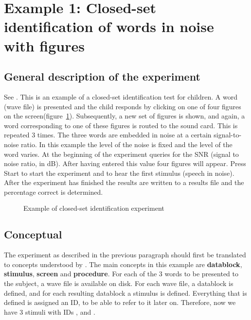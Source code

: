 \newpage
\section{Example 1: Closed-set identification of words in noise with
figures}

\subsection{General description of the experiment} See
. This is an example
of a closed-set identification test for children. A word (wave
file) is presented and the child responds by clicking on one of
four figures on the screen(figure~\ref{fig:closedset}).
Subsequently, a new set of figures is shown, and again, a word
corresponding to one of these figures is routed to the sound card.
This is repeated 3 times. The three words are embedded in noise at
a certain signal-to-noise ratio. In this example the level of the
noise is fixed and the level of the word varies. At the beginning
of the experiment \apex queries for the SNR (signal to noise
ratio, in dB). After having entered this value four figures will
appear. Press Start to start the experiment and to hear the first
stimulus (speech in noise). After the experiment has finished the
results are written to a results file and the percentage correct
is determined.


\begin{figure}
 \centering
 \caption{Example of closed-set identification experiment}
 \label{fig:closedset}
\end{figure}

\subsection{Conceptual}
The experiment as described in the previous paragraph should first
be translated to concepts understood by \apex. The main concepts
in this example are \textbf{datablock}, \textbf{stimulus},
\textbf{screen} and \textbf{procedure}. For each of the 3 words to
be presented to the subject, a wave file is available on disk. For
each wave file, a datablock is defined, and for each resulting
datablock a stimulus is defined. Everything that is defined is
assigned an ID, to be able to refer to it later on. Therefore, now
we have 3 stimuli with IDs , 
and .

